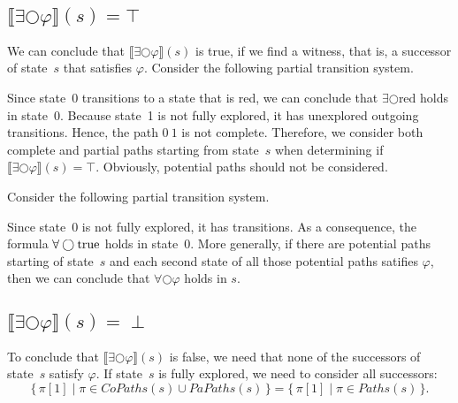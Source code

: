 \documentclass[12pt]{article}
\newcommand{\nxt}{\bigcirc}
\newcommand{\TRUE}{\mbox{\lstinline{true}}}
\theoremstyle{definition}
\newcommand{\satisfaction}[1]{\llbracket #1 \rrbracket}
\begin{document}
\subsection*{$\satisfaction{\exists \nxt \varphi}(s) = \top$}

We can conclude that $\satisfaction{\exists \nxt \varphi}(s)$ is true, if we find a witness, that is, a successor of state~$s$ that satisfies $\varphi$.  Consider the following partial transition system.
\begin{center}
\end{center}
Since state~0 transitions to a state that is red, we can conclude that $\exists \nxt \mbox{red}$ holds in state~0.  Because state~1 is not fully explored, it has unexplored outgoing transitions.  Hence, the path $0\ 1$ is not complete.  Therefore, we consider both complete and partial paths starting from state~$s$ when determining if $\satisfaction{\exists \nxt \varphi}(s) = \top$.  Obviously, potential paths should not be considered.

Consider the following partial transition system.
\begin{center}
\end{center}
Since state~0 is not fully explored, it has transitions.  As a consequence, the formula $\forall \nxt \TRUE$ holds in state~0.  More generally, if there are potential paths starting of state~$s$ and each second state of all those potential paths satifies $\varphi$, then we can conclude that $\forall \nxt \varphi$ holds in $s$.

\subsection*{$\satisfaction{\exists \nxt \varphi}(s) = \perp$}

To conclude that $\satisfaction{\exists \nxt \varphi}(s)$ is false, we need that none of the successors of state~$s$ satisfy $\varphi$.  If state~$s$ is fully explored, we need to consider all successors:
\[
\{\, \pi[1] \mid \pi \in \mathit{CoPaths}(s) \cup \mathit{PaPaths}(s) \,\}
= \{\, \pi[1] \mid \pi \in \mathit{Paths}(s) \,\}.
\]
\end{document}
